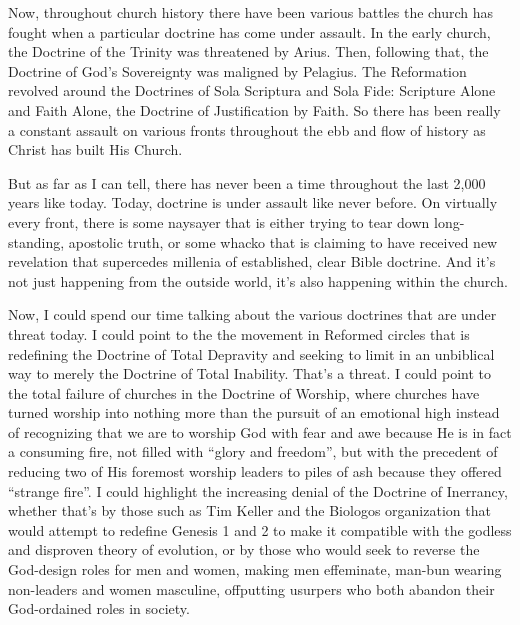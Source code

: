 \documentclass[letterpaper, 12pt]{article}
\begin{document}
    Now, throughout church history there have been various battles the
    church has fought when a particular doctrine has come under assault.
    In the early church, the Doctrine of the Trinity was threatened by
    Arius. Then, following that, the Doctrine of God's Sovereignty was
    maligned by Pelagius. The Reformation revolved around the Doctrines
    of Sola Scriptura and Sola Fide: Scripture Alone and Faith Alone,
    the Doctrine of Justification by Faith. So there has been really a
    constant assault on various fronts throughout the ebb and flow of
    history as Christ has built His Church.

    But as far as I can tell, there has never been a time throughout the
    last 2,000 years like today. Today, doctrine is under assault like
    never before. On virtually every front, there is some naysayer that
    is either trying to tear down long-standing, apostolic truth, or
    some whacko that is claiming to have received new revelation that
    supercedes millenia of established, clear Bible doctrine. And it's
    not just happening from the outside world, it's also happening
    within the church.

    Now, I could spend our time talking about the various doctrines that
    are under threat today. I could point to the the movement in
    Reformed circles that is redefining the Doctrine of Total Depravity
    and seeking to limit in an unbiblical way to merely the Doctrine of
    Total Inability. That's a threat. I could point to the total failure
    of churches in the Doctrine of Worship, where churches have turned
    worship into nothing more than the pursuit of an emotional high
    instead of recognizing that we are to worship God with fear and awe
    because He is in fact a consuming fire, not filled with ``glory and
    freedom'', but with the precedent of reducing two of His foremost
    worship leaders to piles of ash because they offered ``strange
    fire''. I could highlight the increasing denial of the Doctrine of
    Inerrancy, whether that's by those such as Tim Keller and the
    Biologos organization that would attempt to redefine Genesis 1 and 2
    to make it compatible with the godless and disproven theory of
    evolution, or by those who would seek to reverse the God-design
    roles for men and women, making men effeminate, man-bun wearing
    non-leaders and women masculine, offputting usurpers who both
    abandon their God-ordained roles in society.
\end{document}
